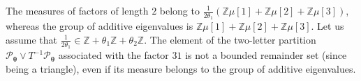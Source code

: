 \documentclass{article}
\theoremstyle{definition}
\newcommand{\btheta}{\boldsymbol{\theta}}
\begin{document}
The measures of factors of length $2$ belong to $\frac{1}{2\theta_1}(\mathbb Z \mu[1]+   \mathbb Z \mu[2]+   \mathbb Z \mu[3])$, whereas   the   group of additive eigenvalues  is $\mathbb Z \mu[1]+   \mathbb Z \mu[2]+   \mathbb Z \mu[3] $.
Let us assume that $ \frac{1}{2\theta_1} \in  \mathbb Z+ \theta_1  \mathbb Z+ \theta_2  \mathbb Z$.
The  element of the two-letter partition  $\mathcal P_{\btheta} \vee T^{-1}\mathcal P_{\btheta} $ associated with the factor   $31$ is not a bounded remainder set (since being a triangle), even if  its measure  belongs to the 
group of additive eigenvalues.


 
 

\nocite{*}



\newpage
\end{document}

